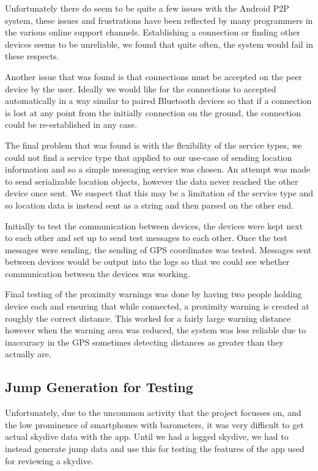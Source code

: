 Unfortunately there do seem to be quite a few issues with the Android P2P system, these issues and frustrations have been reflected by many programmers in the various online support channels. Establishing a connection or finding other devices seems to be unreliable, we found that quite often, the system would fail in these respects.

Another issue that was found is that connections must be accepted on the peer device by the user. Ideally we would like for the connections to accepted automatically in a way similar to paired Bluetooth devices so that if a connection is lost at any point from the initially connection on the ground, the connection could be re-established in any case.

The final problem that was found is with the flexibility of the service types, we could not find a service type that applied to our use-case of sending location information and so a simple messaging service was chosen. An attempt was made to send serializable location objects, however the data never reached the other device once sent. We suspect that this may be a limitation of the service type and so location data is instead sent as a string and then parsed on the other end.

Initially to test the communication between devices, the devices were kept next to each other and set up to send test messages to each other. Once the test messages were sending, the sending of GPS coordinates was tested. Messages sent between devices would be output into the logs so that we could see whether communication between the devices was working.

Final testing of the proximity warnings was done by having two people holding device each and ensuring that while connected, a proximity warning is created at roughly the correct distance. This worked for a fairly large warning distance however when the warning area was reduced, the system was less reliable due to inaccuracy in the GPS sometimes detecting distances as greater than they actually are.

\subsection{Jump Generation for Testing}
Unfortunately, due to the uncommon activity that the project focusses on, and the low prominence of smartphones with barometers, it was very difficult to get actual skydive data with the app. Until we had a logged skydive, we had to instead generate jump data and use this for testing the features of the app used for reviewing a skydive.

